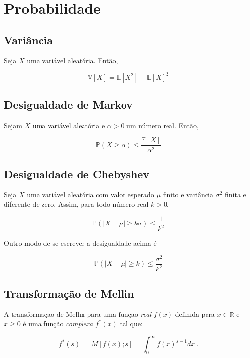 \chapter{Probabilidade}
\label{ap:probability}

\section{Variância}
\label{ap:variance}

Seja $X$ uma variável aleatória. Então,

\[ \mathbb{V}[X] = \mathbb{E}[X^2] - \mathbb{E}[X]^2\]

\section{Desigualdade de Markov}
\label{ap:markov}

Sejam $X$ uma variável aleatória e $\alpha > 0$ um número real. Então,

\[ \mathbb{P}(X \geq \alpha) \leq \frac{\mathbb{E}[X]}{\alpha^2}\]


\section{Desigualdade de Chebyshev}
\label{ap:chebyshev}

Seja $X$ uma variável aleatória com valor esperado $\mu$ finito e variância $\sigma^2$ finita e diferente de zero. 
Assim, para todo número real $k > 0$, 

\[ \mathbb{P}(| X - \mu| \geq k\sigma) \leq \frac{1}{k^2}\]

Outro modo de se escrever a desigualdade acima é 

\[ \mathbb{P}(| X - \mu| \geq k) \leq \frac{\sigma^2}{k^2} \]

\section{Transformação de Mellin}
\label{ap:mellin}

A transformação de Mellin para uma função \textit{real} $f(x)$ definida para $x \in \mathbb{R}$ e $x \geq 0$ é uma função 
\textit{complexa} $f^{*}(x)$ tal que:

\[ f^{*}(s) := M[f(x); s] = \int_{0}^{\infty} f(x)^{s-1} dx \ .\]